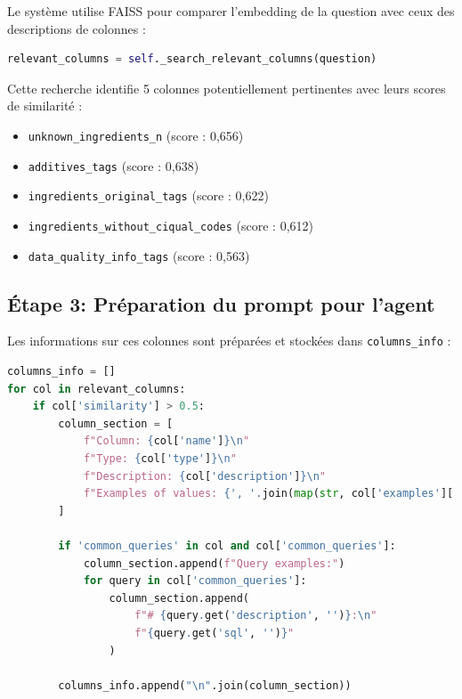 \documentclass[a4paper,11pt]{article}
\begin{document}
Le système utilise FAISS pour comparer l'embedding de la question avec ceux des descriptions de colonnes :

\begin{lstlisting}[language=Python, caption=Recherche sémantique des colonnes pertinentes]
relevant_columns = self._search_relevant_columns(question)
\end{lstlisting}

Cette recherche identifie 5 colonnes potentiellement pertinentes avec leurs scores de similarité :
\begin{itemize}
  \item \texttt{unknown\_ingredients\_n} (score : 0,656)
  \item \texttt{additives\_tags} (score : 0,638)
  \item \texttt{ingredients\_original\_tags} (score : 0,622)
  \item \texttt{ingredients\_without\_ciqual\_codes} (score : 0,612)
  \item \texttt{data\_quality\_info\_tags} (score : 0,563)
\end{itemize}

\newpage
\subsection*{Étape 3: Préparation du prompt pour l'agent}

Les informations sur ces colonnes sont préparées et stockées dans \texttt{columns\_info} :

\begin{lstlisting}[language=Python, caption=Préparation des informations sur les colonnes pertinentes]
columns_info = []
for col in relevant_columns:
    if col['similarity'] > 0.5:
        column_section = [
            f"Column: {col['name']}\n"
            f"Type: {col['type']}\n"
            f"Description: {col['description']}\n"
            f"Examples of values: {', '.join(map(str, col['examples'][:3]))}"
        ]
        
        if 'common_queries' in col and col['common_queries']:
            column_section.append(f"Query examples:")
            for query in col['common_queries']:
                column_section.append(
                    f"# {query.get('description', '')}:\n"
                    f"{query.get('sql', '')}"
                )
        
        columns_info.append("\n".join(column_section))
\end{lstlisting}
\end{document}

